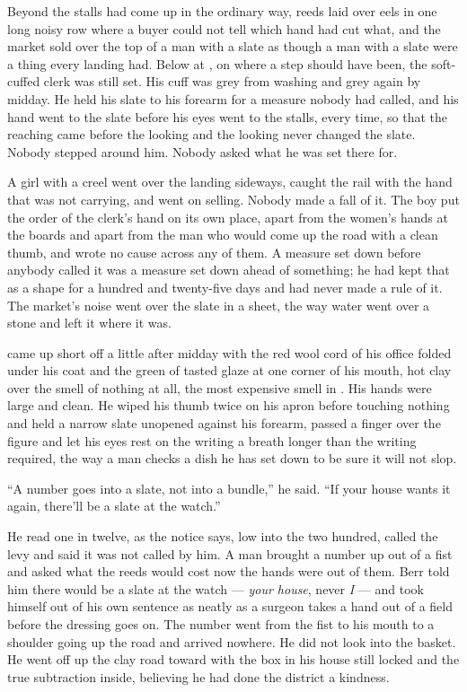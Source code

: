 Beyond  the stalls had come up in the ordinary way, reeds laid over eels in one long noisy row where a buyer could not tell which hand had cut what, and the market sold over the top of a man with a slate as though a man with a slate were a thing every landing had. Below  at , on  where a step should have been, the soft-cuffed clerk was still set. His cuff was grey from washing and grey again by midday. He held his slate to his forearm for a measure nobody had called, and his hand went to the slate before his eyes went to the stalls, every time, so that the reaching came before the looking and the looking never changed the slate. Nobody stepped around him. Nobody asked what he was set there for.

A girl with a creel went over the landing sideways, caught the rail with the hand that was not carrying, and went on selling. Nobody made a fall of it. The boy put the order of the clerk's hand on its own place, apart from the women's hands at the boards and apart from the man who would come up the road with a clean thumb, and wrote no cause across any of them. A measure set down before anybody called it was a measure set down ahead of something; he had kept that as a shape for a hundred and twenty-five days and had never made a rule of it. The market's noise went over the slate in a sheet, the way water went over a stone and left it where it was.

\scenebreak

 came up short off  a little after midday with the red wool cord of his office folded under his coat and the green of tasted glaze at one corner of his mouth, hot clay over the smell of nothing at all, the most expensive smell in . His hands were large and clean. He wiped his thumb twice on his apron before touching nothing and held a narrow slate unopened against his forearm, passed a finger over the figure and let his eyes rest on the writing a breath longer than the writing required, the way a man checks a dish he has set down to be sure it will not slop.

“A number goes into a slate, not into a bundle,” he said. “If your house wants it again, there'll be a slate at the watch.”

He read one in twelve, as the notice says, low into the two hundred, called the levy and said it was not called by him. A man brought a number up out of a fist and asked what the reeds would cost now the hands were out of them. Berr told him there would be a slate at the watch --- \emph{your house}, never \emph{I} --- and took himself out of his own sentence as neatly as a surgeon takes a hand out of a field before the dressing goes on. The number went from the fist to his mouth to a shoulder going up the road and arrived nowhere. He did not look into the basket. He went off up the clay road toward  with the box in his house still locked and the true subtraction inside, believing he had done the district a kindness.

